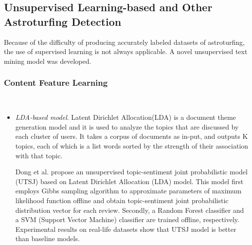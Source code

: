\documentclass[lettersize,journal]{IEEEtran}
\begin{document}
\subsection{Unsupervised Learning-based and Other Astroturfing Detection}

Because of the difficulty of producing accurately labeled datasets of astroturfing, the use of supervised learning is not always applicable. A novel unsupervised text mining model was developed.

\subsubsection{Content Feature Learning}
\
\begin{itemize}
  \item \emph{LDA-based model}. 
Latent Dirichlet Allocation(LDA) is a document theme generation model and it is used to analyze the topics that are discussed by each cluster of users. It takes a corpus of documents as in-put, and outputs K topics, each of which is a list words sorted by the strength of their association with that topic.

	  Dong et al. \cite{dong2018unsupervised} propose an unsupervised topic-sentiment joint probabilistic model (UTSJ) based on Latent Dirichlet Allocation (LDA) model. This model first employs Gibbs sampling algorithm to approximate parameters of maximum likelihood function offline and obtain topic-sentiment joint probabilistic distribution vector for each review. Secondly, a Random Forest classifier and a SVM (Support Vector Machine) classifier are trained offline, respectively. Experimental results on real-life datasets show that UTSJ model is better than baseline models.
	 

\end{itemize}
\end{document}
